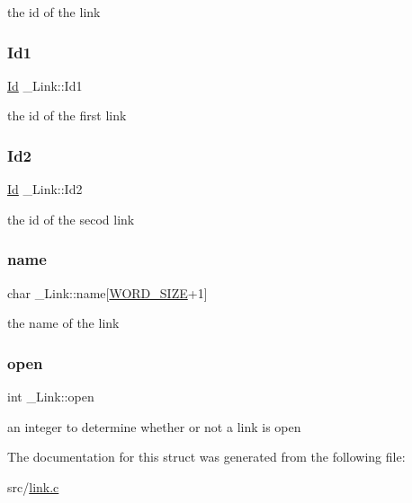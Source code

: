 the id of the link \mbox{\label{struct__Link_a7efa2d80092dce3e13223e81c9ad82c7}} 
\subsubsection{\texorpdfstring{Id1}{Id1}}
{\footnotesize\ttfamily \hyperlink{types_8h_a845e604fb28f7e3d97549da3448149d3}{Id} \+\_\+\+Link\+::\+Id1}

the id of the first link \mbox{\label{struct__Link_a805761a24070055970a61550df3b7607}} 
\subsubsection{\texorpdfstring{Id2}{Id2}}
{\footnotesize\ttfamily \hyperlink{types_8h_a845e604fb28f7e3d97549da3448149d3}{Id} \+\_\+\+Link\+::\+Id2}

the id of the secod link \mbox{\label{struct__Link_a020ee863120055b29609157b9de3c84d}} 
\subsubsection{\texorpdfstring{name}{name}}
{\footnotesize\ttfamily char \+\_\+\+Link\+::name\mbox{[}\hyperlink{types_8h_a92ed8507d1cd2331ad09275c5c4c1c89}{W\+O\+R\+D\+\_\+\+S\+I\+ZE}+1\mbox{]}}

the name of the link \mbox{\label{struct__Link_a5df9107f4ea513f3741d9e4883f4678a}} 
\subsubsection{\texorpdfstring{open}{open}}
{\footnotesize\ttfamily int \+\_\+\+Link\+::open}

an integer to determine whether or not a link is open 

The documentation for this struct was generated from the following file\+:\begin{DoxyCompactItemize}
\item 
src/\hyperlink{link_8c}{link.\+c}\end{DoxyCompactItemize}
